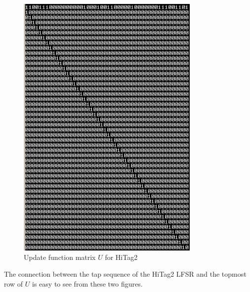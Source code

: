 \begin{figure}[h!]
	\centering
	\includegraphics[width=3.5in]{./figures/hitag2-transition-matrix.png}
	\caption{Update function matrix $U$ for HiTag2}	
	\label{fig:hitag2-transition-matrix}
\end{figure}

The connection between the tap sequence of the HiTag2 LFSR and the topmost row of $U$ is easy to see from these two figures. 

